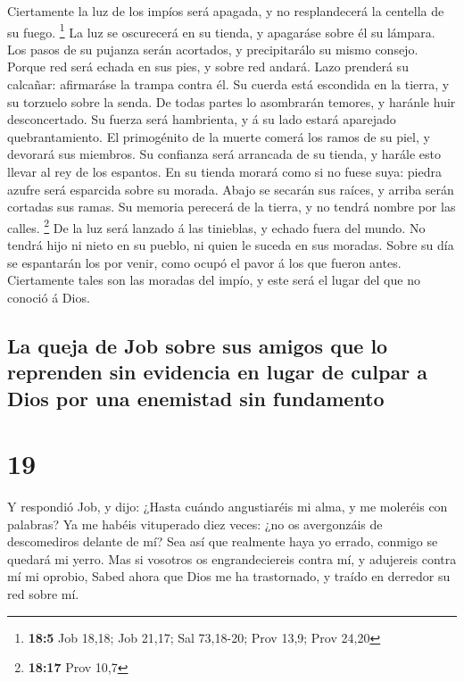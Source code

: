  Ciertamente la luz de los impíos será apagada, y no
resplandecerá la centella de su fuego. \footnote{\textbf{18:5} Job
  18,18; Job 21,17; Sal 73,18-20; Prov 13,9; Prov 24,20} 
La luz se oscurecerá en su tienda, y apagaráse sobre él su lámpara.
 Los pasos de su pujanza serán acortados, y precipitarálo
su mismo consejo.  Porque red será echada en sus pies, y
sobre red andará.  Lazo prenderá su calcañar: afirmaráse
la trampa contra él.  Su cuerda está escondida en la
tierra, y su torzuelo sobre la senda.  De todas partes lo
asombrarán temores, y haránle huir desconcertado.  Su
fuerza será hambrienta, y á su lado estará aparejado quebrantamiento.
 El primogénito de la muerte comerá los ramos de su piel,
y devorará sus miembros.  Su confianza será arrancada de
su tienda, y harále esto llevar al rey de los espantos. 
En su tienda morará como si no fuese suya: piedra azufre será esparcida
sobre su morada.  Abajo se secarán sus raíces, y arriba
serán cortadas sus ramas.  Su memoria perecerá de la
tierra, y no tendrá nombre por las calles. \footnote{\textbf{18:17} Prov
  10,7}  De la luz será lanzado á las tinieblas, y echado
fuera del mundo.  No tendrá hijo ni nieto en su pueblo,
ni quien le suceda en sus moradas.  Sobre su día se
espantarán los por venir, como ocupó el pavor á los que fueron antes.
 Ciertamente tales son las moradas del impío, y este será
el lugar del que no conoció á Dios.

\hypertarget{la-queja-de-job-sobre-sus-amigos-que-lo-reprenden-sin-evidencia-en-lugar-de-culpar-a-dios-por-una-enemistad-sin-fundamento}{%
\subsection{La queja de Job sobre sus amigos que lo reprenden sin
evidencia en lugar de culpar a Dios por una enemistad sin
fundamento}\label{la-queja-de-job-sobre-sus-amigos-que-lo-reprenden-sin-evidencia-en-lugar-de-culpar-a-dios-por-una-enemistad-sin-fundamento}}

\hypertarget{section-18}{%
\section{19}\label{section-18}}

 Y respondió Job, y dijo:  ¿Hasta cuándo
angustiaréis mi alma, y me moleréis con palabras?  Ya me
habéis vituperado diez veces: ¿no os avergonzáis de descomediros delante
de mí?  Sea así que realmente haya yo errado, conmigo se
quedará mi yerro.  Mas si vosotros os engrandeciereis
contra mí, y adujereis contra mí mi oprobio,  Sabed ahora
que Dios me ha trastornado, y traído en derredor su red sobre mí.

